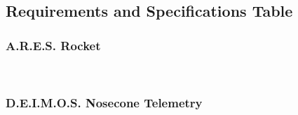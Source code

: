 \documentclass[11pt]{IEEEtran}
\newcommand{\ares}{A.R.E.S.}
\newcommand{\deimos}{D.E.I.M.O.S.}
\begin{document}
\subsection{Requirements and Specifications Table}

\subsubsection*{\ares{} Rocket}
~\\


\subsubsection*{\deimos{} Nosecone Telemetry}
~\\
\end{document}
